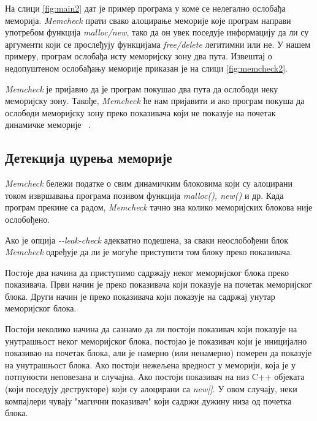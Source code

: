 \documentclass[12pt,oneside]{memoir}
\begin{document}
\indent На слици \ref{fig:main2} дат је пример програма у коме се нелегално ослобађа меморија. \textit{Memcheck} прати свако алоцирање меморије које програм направи употребом функција \textit{malloc/new}, тако да он увек поседује информацију да ли су аргументи који се прослеђују функцијама \textit{free/delete} легитимни или не. У нашем примеру, програм ослобађа исту меморијску зону два пута. Извештај о недопуштеном ослобађању меморије приказан је на слици \ref{fig:memcheck2}.

\indent \textit{Memcheck} је пријавио да је програм покушао два пута да ослободи неку меморијску зону.  Такође, \textit{Memcheck} ће нам пријавити и ако програм покуша да ослободи меморијску зону преко показивача који не показује на почетак динамичке меморије ~\cite{memcheckRef}.

\subsection{Детекција цурења меморије}

\indent \textit{Memcheck} бележи податке о свим динамичким блоковима који су алоцирани током извршавања програма позивом функција \textit{malloc(), new()} и др. Када програм прекине са радом, \textit{Memcheck} тачно зна колико меморијских блокова није ослобођено.

\indent Ако је опција \textit{-\--leak-check} адекватно подешена, за сваки неослобођени блок \textit{Memcheck} одређује да ли је могуће приступити том блоку преко показивача.

\indent Постоје два начина да приступимо садржају неког меморијског блока преко показивача. Први начин је преко показивача који показује на почетак меморијског блока. Други начин је преко показивача који показује на садржај унутар меморијског блока.

\indent Постоји неколико начина да сазнамо да ли постоји показивач који показује на унутрашњост неког меморијског блока, постојао је показивач који је иницијално показивао на почетак блока, али је намерно (или ненамерно) померен да показује на унутрашњост блока. Ако постоји нежељена вредност у меморији, која је у потпуности неповезана и случајна. Ако постоји показивач на низ C++ објеката (који поседују деструкторе) који су алоцирани са \textit{new[]}. У овом случају, неки компајлери чувају "магични показивач" који садржи дужину низа од почетка блока.
\end{document}
